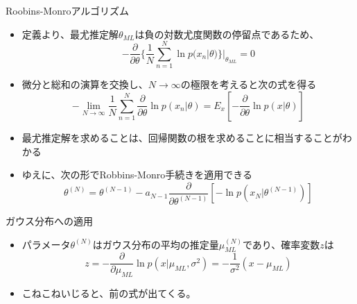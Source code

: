  \begin{frame}{Roobins-Monroアルゴリズム}
	\begin{itemize}
	 \item 定義より、最尤推定解$\theta_{ML}$は負の対数尤度関数の停留点であるため、
				 \begin{equation}
					-\frac{\partial }{\partial \theta}\{\frac{1}{N}\sum_{n=1}^{N}\ln  p(x_n|\theta)\}|_{\theta_{ML}} = 0
				 \end{equation}
	 \item 微分と総和の演算を交換し、$N\rightarrow\infty$の極限を考えると次の式を得る
				 \begin{equation}
-\lim_{N \rightarrow \infty}\frac{1}{N}\sum_{n=1}^{N}\frac{\partial}{\partial \theta}\ln p(x_n|\theta)=E_x[-\frac{\partial}{\partial \theta}\ln p(x|\theta)]
				 \end{equation}
	 \item 最尤推定解を求めることは、回帰関数の根を求めることに相当することがわかる
	\end{itemize}
 \end{frame}

 \begin{frame}
	\begin{itemize}
	 \item ゆえに、次の形でRobbins-Monro手続きを適用できる
\begin{equation}
 \theta^{(N)}=\theta^{(N-1)}-a_{N-1}\frac{\partial}{\partial \theta^{(N-1)}}[-\ln p(x_N|\theta^{(N-1)})]
\end{equation}
	\end{itemize}
 \end{frame}

  \begin{frame}{ガウス分布への適用}
	\begin{itemize}
	 \item パラメータ$\theta^{(N)}$はガウス分布の平均の推定量$\mu_{ML}^{(N)}$であり、確率変数$z$は
\begin{equation}
z=-\frac{\partial}{\partial \mu_{ML}} \ln p(x|\mu_{ML}, \sigma^2) = -\frac{1}{\sigma^2}(x-\mu_{ML})
\end{equation}
	 \item こねこねいじると、前の式が出てくる。
	\end{itemize}
 \end{frame}

